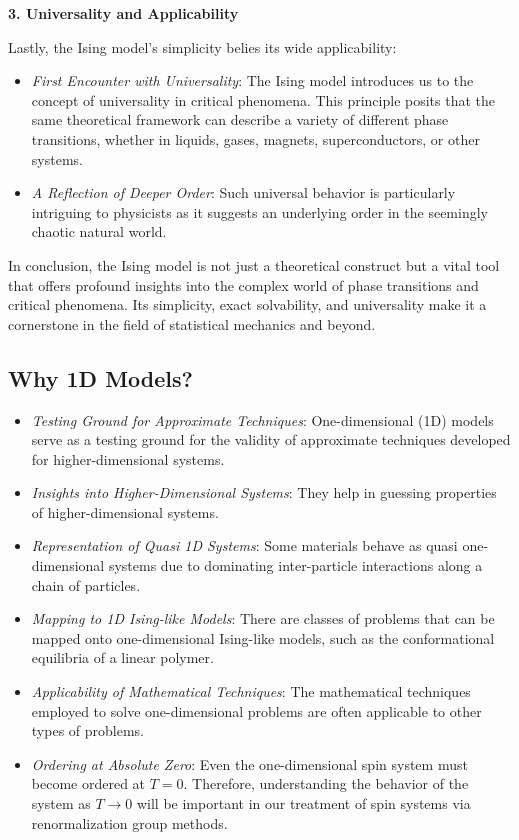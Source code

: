 \textbf{3. Universality and Applicability}

Lastly, the Ising model's simplicity belies its wide applicability:

\begin{itemize}
  \item \textit{First Encounter with Universality}: The Ising model introduces
  us to the concept of universality in critical phenomena. This principle posits
  that the same theoretical framework can describe a variety of different phase
  transitions, whether in liquids, gases, magnets, superconductors, or other
  systems.
  \item \textit{A Reflection of Deeper Order}: Such universal behavior is
  particularly intriguing to physicists as it suggests an underlying order in
  the seemingly chaotic natural world.
\end{itemize}

In conclusion, the Ising model is not just a theoretical construct but a vital
tool that offers profound insights into the complex world of phase transitions
and critical phenomena. Its simplicity, exact solvability, and universality make
it a cornerstone in the field of statistical mechanics and beyond.


\subsection{Why 1D Models?}
\begin{itemize}
  \item \textit{Testing Ground for Approximate Techniques}: One-dimensional (1D)
  models serve as a testing ground for the validity of approximate techniques
  developed for higher-dimensional systems.
  \item \textit{Insights into Higher-Dimensional Systems}: They help in guessing
  properties of higher-dimensional systems.
  \item \textit{Representation of Quasi 1D Systems}: Some materials behave as
  quasi one-dimensional systems due to dominating inter-particle interactions
  along a chain of particles.
  \item \textit{Mapping to 1D Ising-like Models}: There are classes of problems
  that can be mapped onto one-dimensional Ising-like models, such as the
  conformational equilibria of a linear polymer.
  \item \textit{Applicability of Mathematical Techniques}: The mathematical
  techniques employed to solve one-dimensional problems are often applicable to
  other types of problems.
  \item \textit{Ordering at Absolute Zero}: Even the one-dimensional spin system
  must become ordered at \( T = 0 \). Therefore, understanding the behavior of
  the system as \( T \rightarrow 0 \) will be important in our treatment of spin
  systems via renormalization group methods.
\end{itemize}